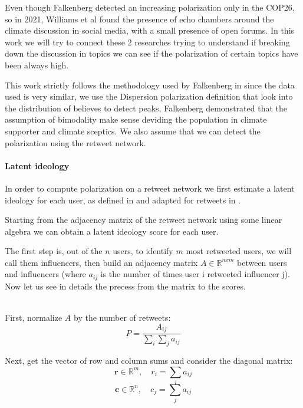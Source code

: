 Even though Falkenberg detected an increasing polarization only in the COP26, so in 2021, Williams et al \cite{williams_network_2015} found the presence of echo chambers around the climate discussion in social media, with a small presence of open forums. In this work we will try to connect these 2 researches trying to understand if breaking down the discussion in topics we can see if the polarization of certain topics have been always high. 


This work strictly follows the methodology used by Falkenberg in \cite{falkenberg_growing_2022} since the data used is very similar, we use the Dispersion polarization  definition that look into the distribution of believes to detect peaks, Falkenberg demonstrated that the assumption of bimodality make sense deviding the population in climate supporter and climate sceptics. We also assume that we can detect the polarization using the retweet network.

\paragraph{Latent ideology}
In order to compute polarization on a retweet network we first estimate a latent ideology for each user, as defined in \cite{barbera_birds_2015} and adapted for retweets in \cite{flamino_shifting_2021}.


Starting from the adjacency matrix of the retweet network  using some linear algebra we can obtain a latent ideology score for each user.

The first step is, out of the $n$ users, to identify $m$ most retweeted users, we will call them influencers, then build an adjacency matrix $A\in \mathbb{R}^{n x m}$ between users and influencers (where \(a_{ij}\) is the number of times user i retweeted influencer j). Now let us see in details the precess from the matrix to the scores.

\\

First, normalize $A$ by the number of retweets:
\begin{equation}
P =  \frac{A_{ij}}{\sum_{i} \sum_{j} a_{ij}}
\end{equation}

Next, get the vector of row and column sums and consider the diagonal matrix:
\begin{equation}
\textbf{r} \in \mathbb{R}^m, \quad  r_i = \sum_{i} a_{ij}
\end{equation}
\begin{equation}
\textbf{c} \in \mathbb{R}^n , \quad c_j = \sum_{j} a_{ij} 
\end{equation}





